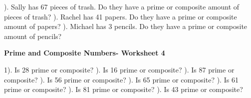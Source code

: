 \documentclass{article}%
\begin{document}
\newline%
\newline%
). Sally has 67 pieces of trash. Do they have a prime or composite amount of pieces of trash?%
\newline%
\newline%
). Rachel has 41 papers. Do they have a prime or composite amount of papers?%
\newline%
\newline%
). Michael has 3 pencils. Do they have a prime or composite amount of pencils?%
\newline%
\newline%
\newline%
\pagebreak%
\large%
\begin{center}%
\textbf{Prime and Composite Numbers- Worksheet 4}%
\newline%
\newline%
\newline%
\end{center} \normalsize%
1). Is 28 prime or composite?%
\newline%
\newline%
). Is 16 prime or composite?%
\newline%
\newline%
). Is 87 prime or composite?%
\newline%
\newline%
). Is 56 prime or composite?%
\newline%
\newline%
). Is 65 prime or composite?%
\newline%
\newline%
). Is 61 prime or composite?%
\newline%
\newline%
). Is 81 prime or composite?%
\newline%
\newline%
). Is 43 prime or composite?%
\newline%
\newline%
\end{document}
